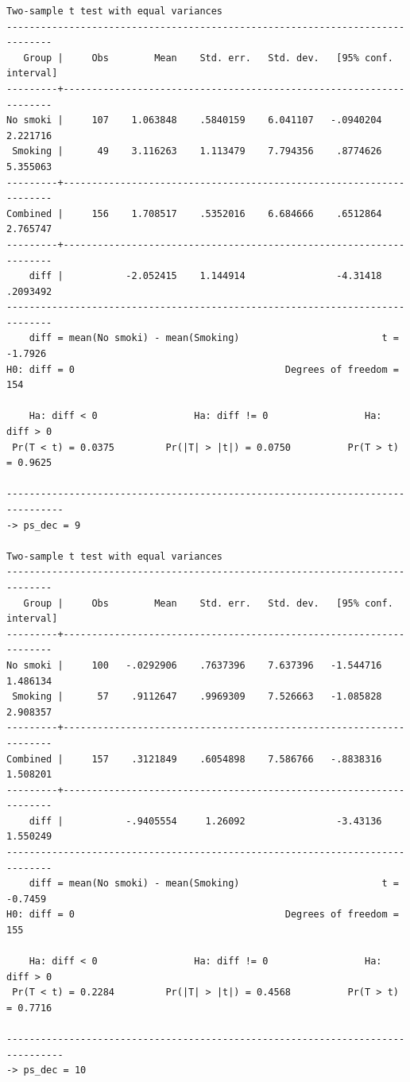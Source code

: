 \documentclass[
  10pt,
]{book}
\begin{document}
\begin{verbatim}
Two-sample t test with equal variances
------------------------------------------------------------------------------
   Group |     Obs        Mean    Std. err.   Std. dev.   [95% conf. interval]
---------+--------------------------------------------------------------------
No smoki |     107    1.063848    .5840159    6.041107   -.0940204    2.221716
 Smoking |      49    3.116263    1.113479    7.794356    .8774626    5.355063
---------+--------------------------------------------------------------------
Combined |     156    1.708517    .5352016    6.684666    .6512864    2.765747
---------+--------------------------------------------------------------------
    diff |           -2.052415    1.144914                -4.31418    .2093492
------------------------------------------------------------------------------
    diff = mean(No smoki) - mean(Smoking)                         t =  -1.7926
H0: diff = 0                                     Degrees of freedom =      154

    Ha: diff < 0                 Ha: diff != 0                 Ha: diff > 0
 Pr(T < t) = 0.0375         Pr(|T| > |t|) = 0.0750          Pr(T > t) = 0.9625

--------------------------------------------------------------------------------
-> ps_dec = 9

Two-sample t test with equal variances
------------------------------------------------------------------------------
   Group |     Obs        Mean    Std. err.   Std. dev.   [95% conf. interval]
---------+--------------------------------------------------------------------
No smoki |     100   -.0292906    .7637396    7.637396   -1.544716    1.486134
 Smoking |      57    .9112647    .9969309    7.526663   -1.085828    2.908357
---------+--------------------------------------------------------------------
Combined |     157    .3121849    .6054898    7.586766   -.8838316    1.508201
---------+--------------------------------------------------------------------
    diff |           -.9405554     1.26092                -3.43136    1.550249
------------------------------------------------------------------------------
    diff = mean(No smoki) - mean(Smoking)                         t =  -0.7459
H0: diff = 0                                     Degrees of freedom =      155

    Ha: diff < 0                 Ha: diff != 0                 Ha: diff > 0
 Pr(T < t) = 0.2284         Pr(|T| > |t|) = 0.4568          Pr(T > t) = 0.7716

--------------------------------------------------------------------------------
-> ps_dec = 10


\end{verbatim}
\end{document}
